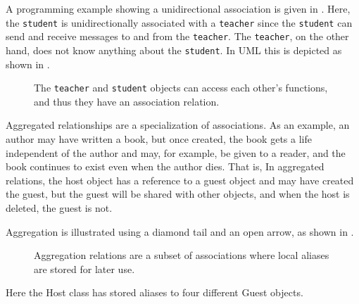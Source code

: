 \documentclass[fsharpNotes.tex]{subfiles}
\begin{document}
A programming example showing a unidirectional association is given in .
% 
% 
Here, the \lstinline{student} is unidirectionally associated with a \lstinline{teacher} since the \lstinline{student} can send and receive messages to and from the \lstinline{teacher}. The \lstinline{teacher}, on the other hand, does not know anything about the \lstinline{student}. In UML this is depicted as shown in .
\begin{figure}
  \centering
  \caption{The \lstinline{teacher} and \lstinline{student} objects can access each other's functions, and thus they have an association relation.}
  \label{fig:umlAssociationUML}
\end{figure}

Aggregated relationships are a specialization of associations. As an example, an author may have written a book, but once created, the book gets a life independent of the author and may, for example, be given to a reader, and the book continues to exist even when the author dies. That is, In aggregated relations, the host object has a reference to a guest object and may have created the guest, but the guest will be shared with other objects, and when the host is deleted, the guest is not.

Aggregation is illustrated using a diamond tail and an open arrow, as shown in .
\begin{figure}
  \centering
  \caption{Aggregation relations are a subset of associations where local aliases are stored for later use.}
  \label{fig:aggregation}
\end{figure}
Here the Host class has stored aliases to four different Guest objects.
\end{document}
